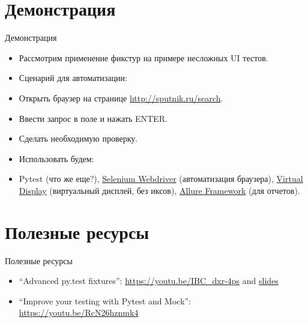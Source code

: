 \documentclass{beamer}
\begin{document}
\section{Демонстрация}
\begin{frame}[fragile]{Демонстрация}
	\begin{itemize}
	\item Рассмотрим применение фикстур на примере несложных UI тестов.
	\pause \item Сценарий для автоматизации:
	\pause \item Открыть браузер на странице \url{http://sputnik.ru/search}.
	\pause \item Ввести запрос в поле и нажать ENTER.
	\pause \item Сделать необходимую проверку.
	\pause \item Использовать будем:
	\pause \item Pytest (что же еще?),
		\href{http://selenium-python.readthedocs.io/}{Selenium Webdriver} (автоматизация браузера),
		\href{https://github.com/ponty/pyvirtualdisplay}{Virtual Display} (виртуальный дисплей, без иксов),
		\href{http://allure.qatools.ru/}{Allure Framework} (для отчетов).
	\end{itemize}
\end{frame}

\section{Полезные ресурсы}
\begin{frame}[fragile]{Полезные ресурсы}
	\begin{itemize}
	\item ``Advanced py.test fixtures'':
		\url{https://youtu.be/IBC_dxr-4ps} and
		\href{http://devork.be/talks/advanced-fixtures/advfix.html}{slides}
	\item ``Improve your testing with Pytest and Mock'':
		\url{https://youtu.be/RcN26hznmk4}
	\end{itemize}
\end{frame}
\end{document}
